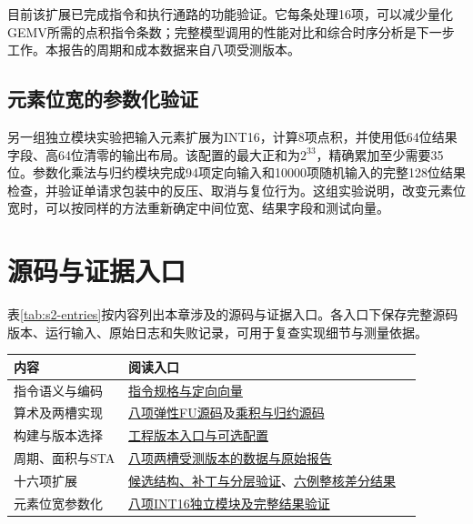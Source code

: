 目前该扩展已完成指令和执行通路的功能验证。它每条处理16项，可以减少量化GEMV所需的点积指令条数；完整模型调用的性能对比和综合时序分析是下一步工作。本报告的周期和成本数据来自八项受测版本。

\subsection{元素位宽的参数化验证}\label{sec:2-int16}
另一组独立模块实验把输入元素扩展为INT16，计算8项点积，并使用低64位结果字段、高64位清零的输出布局。该配置的最大正和为$2^{33}$，精确累加至少需要35位。参数化乘法与归约模块完成94项定向输入和10000项随机输入的完整128位结果检查，并验证单请求包装中的反压、取消与复位行为。这组实验说明，改变元素位宽时，可以按同样的方法重新确定中间位宽、结果字段和测试向量。


\needspace{0.42\textheight}
\section{源码与证据入口}
表\ref{tab:s2-entries}按内容列出本章涉及的源码与证据入口。各入口下保存完整源码版本、运行输入、原始日志和失败记录，可用于复查实现细节与测量依据。
\begin{center}
\small\captionsetup{type=table}
\caption{第二阶段源码与证据入口}\label{tab:s2-entries}
\begin{tabular}{p{0.25\linewidth}p{0.64\linewidth}}
\toprule
内容 & 阅读入口\\
\midrule
指令语义与编码 & \href{https://github.com/cc77-builder/riscv/blob/a0f13456e0c3180fe9c4023f5cbe7874eb5d35a9/team/spec/vdot.md}{指令规格与定向向量}\\
算术及两槽实现 & \href{https://github.com/cc77-builder/riscv/blob/0f12df675378556670afd0dd2153f47fcb330610/src/main/scala/xiangshan/backend/fu/wrapper/VDotElastic.scala}{八项弹性FU源码}及\href{https://github.com/cc77-builder/riscv/blob/0f12df675378556670afd0dd2153f47fcb330610/src/main/scala/xiangshan/backend/fu/vector/VDotDatapath.scala}{乘积与归约源码}\\
构建与版本选择 & \href{https://github.com/cc77-builder/riscv/blob/f5f67e8640d8fda412e8a8946ffb8168f67d79fa/team/docs/development-route-current.md}{工程版本入口与可选配置}\\
周期、面积与STA & \href{https://github.com/cc77-builder/riscv/blob/a0f13456e0c3180fe9c4023f5cbe7874eb5d35a9/team/optimizations/o2/r3-div-gate/PERFORMANCE_COST_RESULT.md}{八项两槽受测版本的数据与原始报告}\\
十六项扩展 & \href{https://github.com/cc77-builder/riscv/blob/f5f67e8640d8fda412e8a8946ffb8168f67d79fa/team/optimizations/o2/dot16/rtl-integration/README.md}{候选结构、补丁与分层验证}、\href{https://github.com/cc77-builder/riscv/blob/f5f67e8640d8fda412e8a8946ffb8168f67d79fa/team/optimizations/o2/dot16/rtl-integration/fullcore/RESULT.md}{六例整核差分结果}\\
元素位宽参数化 & \href{https://github.com/cc77-builder/riscv/blob/a0f13456e0c3180fe9c4023f5cbe7874eb5d35a9/team/docs/t15-parameter-extension.md}{八项INT16独立模块及完整结果验证}\\
\bottomrule
\end{tabular}
\end{center}
